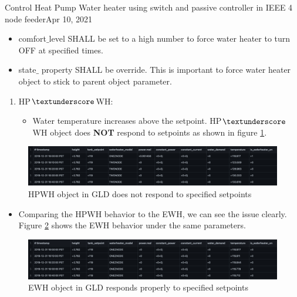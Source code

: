 \begin{entry}{Control Heat Pump Water heater using switch and passive controller in IEEE 4 node feeder}{Apr 10, 2021}
\begin{enumerate}
\begin{itemize}
                \item comfort$\_$level SHALL be set to a high number to force water heater to turn OFF at specified times.
                \item state$\_$ property SHALL be override. This is important to force water heater object to stick to parent object parameter.
            \end{itemize}
    \end{enumerate}
    \observations
    \begin{enumerate}
        \item HP$\textunderscore$WH:
        \begin{itemize}
            \item Water temperature increases above the setpoint. HP$\textunderscore$WH object does \textbf{NOT} respond to setpoints as shown in figure \ref{fig:HPWH}.
    \end{itemize}
    \end{enumerate}
    \begin{figure}[htp!]
        \centering
        \includegraphics[width=1.1\columnwidth]{Spring2021/HPWH_wrong_behavior.png}
        \caption{HPWH object in GLD does not respond to specified setpoints}
        \label{fig:HPWH}
    \end{figure}
    \begin{itemize}
        \item Comparing the HPWH behavior to the EWH, we can see the issue clearly. Figure \ref{fig:EWH} shows the EWH behavior under the same parameters.
    \end{itemize}
    \begin{figure}[htp!]
        \centering
        \includegraphics[width=1.1\columnwidth]{Spring2021/EWH.png}
        \caption{EWH object in GLD responds properly to specified setpoints}
        \label{fig:EWH}
    \end{figure}
\newpage
    
\debugging

\end{entry}
